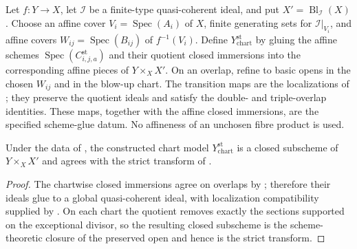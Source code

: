 \begin{definition}
  \label{def:nagata-strict-transform-closed-chart-model}

  Let $f\colon Y\to X$, let $\mathcal I$ be a finite-type quasi-coherent
  ideal, and put $X'=\operatorname{Bl}_{\mathcal I}(X)$.  Choose an affine
  cover $V_i=\operatorname{Spec}(A_i)$ of $X$, finite generating sets for
  $\mathcal I|_{V_i}$, and affine covers
  $W_{ij}=\operatorname{Spec}(B_{ij})$ of $f^{-1}(V_i)$.  Define
  $Y^{\mathrm{st}}_{\mathrm{chart}}$ by gluing the affine schemes
  $\operatorname{Spec}(C_{i,j,a}^{\mathrm{st}})$ and their quotient closed
  immersions into the corresponding affine pieces of $Y\times_XX'$.
  On an overlap, refine to basic opens in the chosen $W_{ij}$ and in the
  blow-up chart.  The transition maps are the localizations of
  ; they preserve
  the quotient ideals and satisfy the double- and triple-overlap identities.
  These maps, together with the affine closed immersions, are the specified
  scheme-glue datum.  No affineness of an unchosen fibre product is used.
\end{definition}

\begin{proposition}
  \label{prop:nagata-strict-transform-closed-fiber-product}

  Under the data of
  , the constructed chart
  model $Y^{\mathrm{st}}_{\mathrm{chart}}$ is a closed
  subscheme of $Y\times_XX'$ and agrees with the strict transform of
  .
\end{proposition}

\begin{proof}
  The chartwise closed immersions agree on overlaps by
  ; therefore their ideals
  glue to a global quasi-coherent ideal, with localization compatibility
  supplied by .
  On each chart the quotient removes
  exactly the sections supported on the exceptional divisor, so the resulting
  closed subscheme is the scheme-theoretic closure of the preserved open and
  hence is the strict transform.
\end{proof}

